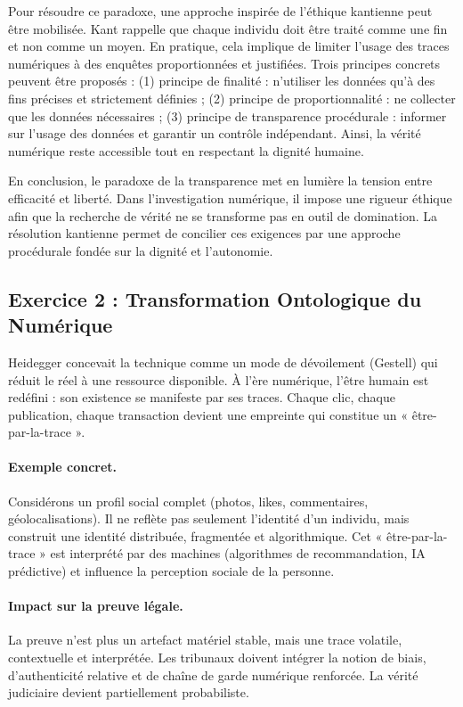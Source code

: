 \documentclass[12pt,a4paper]{article}
\begin{document}
Pour résoudre ce paradoxe, une approche inspirée de l’éthique kantienne peut être mobilisée. Kant rappelle que chaque individu doit être traité comme une fin et non comme un moyen. En pratique, cela implique de limiter l’usage des traces numériques à des enquêtes proportionnées et justifiées. Trois principes concrets peuvent être proposés : (1) principe de finalité : n’utiliser les données qu’à des fins précises et strictement définies ; (2) principe de proportionnalité : ne collecter que les données nécessaires ; (3) principe de transparence procédurale : informer sur l’usage des données et garantir un contrôle indépendant. Ainsi, la vérité numérique reste accessible tout en respectant la dignité humaine.

En conclusion, le paradoxe de la transparence met en lumière la tension entre efficacité et liberté. Dans l’investigation numérique, il impose une rigueur éthique afin que la recherche de vérité ne se transforme pas en outil de domination. La résolution kantienne permet de concilier ces exigences par une approche procédurale fondée sur la dignité et l’autonomie.

\subsection*{Exercice 2 : Transformation Ontologique du Numérique}
Heidegger concevait la technique comme un mode de dévoilement (Gestell) qui réduit le réel à une ressource disponible. À l’ère numérique, l’être humain est redéfini : son existence se manifeste par ses traces. Chaque clic, chaque publication, chaque transaction devient une empreinte qui constitue un « être-par-la-trace ». 

\paragraph{Exemple concret.} Considérons un profil social complet (photos, likes, commentaires, géolocalisations). Il ne reflète pas seulement l’identité d’un individu, mais construit une identité distribuée, fragmentée et algorithmique. Cet « être-par-la-trace » est interprété par des machines (algorithmes de recommandation, IA prédictive) et influence la perception sociale de la personne.

\paragraph{Impact sur la preuve légale.} La preuve n’est plus un artefact matériel stable, mais une trace volatile, contextuelle et interprétée. Les tribunaux doivent intégrer la notion de biais, d’authenticité relative et de chaîne de garde numérique renforcée. La vérité judiciaire devient partiellement probabiliste.
\end{document}
